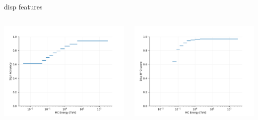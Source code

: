 \documentclass[aspectratio=1610, 9pt]{beamer}
\begin{document}
\begin{frame}{disp features}
  \begin{columns}[T]
    \begin{column}{.45\textwidth}
      \includegraphics[width=\textwidth]{../analysis/plots/disp_accuracy_gamma.pdf}
    \end{column}
    \begin{column}{.45\textwidth}
      \includegraphics[width=\textwidth]{../analysis/plots/disp_r2_gamma.pdf}
    \end{column} 
  \end{columns}
\end{frame}
\end{document}
